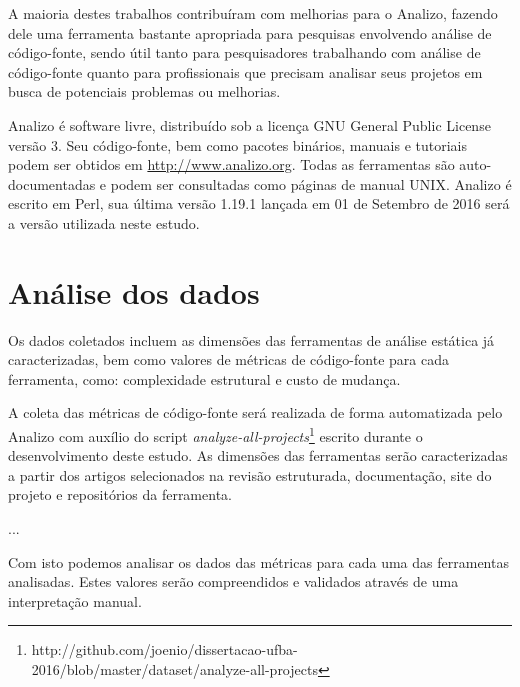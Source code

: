A maioria destes trabalhos contribuíram com melhorias para o Analizo, fazendo
dele uma ferramenta bastante apropriada para pesquisas envolvendo análise de código-fonte,
sendo útil tanto para pesquisadores trabalhando com análise de código-fonte
quanto para profissionais que precisam analisar seus projetos em busca de
potenciais problemas ou melhorias.

Analizo é software livre, distribuído sob a licença GNU General Public License
versão 3. Seu código-fonte, bem como pacotes binários, manuais e tutoriais
podem ser obtidos em \url{http://www.analizo.org}. Todas as ferramentas são
auto-documentadas e podem ser consultadas como páginas de manual UNIX. Analizo
é escrito em Perl, sua última versão 1.19.1 lançada em 01 de Setembro de 2016
será a versão utilizada neste estudo.

\section{Análise dos dados} \label{analise}

Os dados coletados incluem as dimensões das ferramentas de análise estática já
caracterizadas, bem como valores de métricas de código-fonte para cada
ferramenta, como: complexidade estrutural e custo de mudança.

A coleta das métricas de código-fonte será realizada de forma automatizada pelo
Analizo com auxílio do script {\em
analyze-all-projects}\footnote{http://github.com/joenio/dissertacao-ufba-2016/blob/master/dataset/analyze-all-projects}
escrito durante o desenvolvimento deste estudo. As dimensões das ferramentas
serão caracterizadas a partir dos artigos selecionados na revisão estruturada,
documentação, site do projeto e repositórios da ferramenta.

...

Com isto podemos analisar os dados das métricas para cada uma das ferramentas analisadas.
Estes valores serão compreendidos e validados através de uma interpretação manual.

